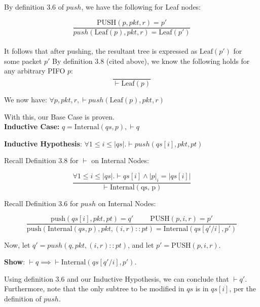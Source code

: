 \documentclass{article}
\begin{document}
\noindent By definition 3.6 of $push$, we have the following for Leaf nodes:

$$\frac{\text{PUSH}(p, pkt, r) = p'}{push(\text{Leaf}(p), pkt, r) = \text{Leaf}(p')}$$\\[-10pt]

\noindent It follows that after pushing, the resultant tree is expressed as $\text{Leaf}(p')$ for some packet $p'$ By definition 3.8 (cited above), we know the following holds for any arbitrary PIFO $p$:\\[-10pt]

$$\frac{}{\vdash \text{Leaf}(p)}$$

\noindent We now have: $\forall p, pkt, r, \vdash push(\text{Leaf}(p), pkt, r)$\newline

\noindent With this, our Base Case is proven.\\[10pt]

\noindent \textbf{Inductive Case:} $q = \text{Internal}(qs, p), \vdash q$\newline

\noindent \textbf{Inductive Hypothesis}: $\forall 1 \leq i \leq |qs|. \vdash push(qs[i], pkt, pt)$\newline

\noindent Recall Definition 3.8 for $\vdash$ on Internal Nodes:

$$\frac{\forall 1 \leq i \leq |qs|. \vdash qs[i] \land |p|_i = |qs[i]|}{\vdash \text{Internal}(\text{qs, p})}$$\newline

\noindent Recall Definition 3.6 for $push$ on Internal Nodes:

$$\frac{\text{push}(qs[i], pkt, pt) = q' \hspace{1cm} \text{PUSH}(p, i, r) = p'}{\text{push}(\text{Internal}(qs, p), pkt, (i, r) :: pt) = \text{Internal}(qs[q'/i], p')}$$\newline

\noindent Now, let $q' = push(q, pkt, (i, r) :: pt)$, and let $p' = \text{PUSH}(p, i, r)$.\newline

\noindent \textbf{Show}: $\vdash q \implies \vdash \text{Internal}(qs[q'/i], p')$.\newline

\noindent Using definition 3.6 and our Inductive Hypothesis, we can conclude that $\vdash q'$. Furthermore, note that the only subtree to be modified in $qs$ is in $qs[i]$, per the definition of $push$.\newline
\end{document}
